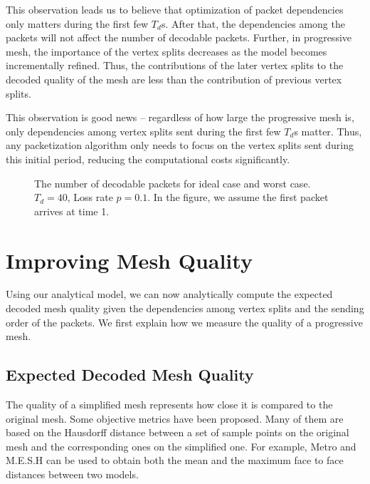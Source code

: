     This observation leads us to believe that optimization of
    packet dependencies only matters during the first few $T_d$s. 
    After that, the dependencies among the packets will not affect
    the number of decodable packets.  Further, in progressive mesh,
    the importance of the vertex splits decreases as the model becomes
    incrementally refined.  Thus, the contributions of the later vertex
    splits to the decoded quality of the mesh are less than the contribution
    of previous vertex splits.

    This observation is good news -- regardless of how large the
    progressive mesh is, only dependencies among vertex splits sent during the
    first few $T_d$s matter.  Thus, any packetization
    algorithm only needs to focus on the vertex splits sent during
    this initial period, reducing the computational costs significantly.

\begin{figure}[htbp]
\centering
{}
\caption{The number of decodable packets for ideal case and worst case. $T_d= 40$, Loss rate $p =0.1$. In the figure, we assume the first packet arrives at time 1.}\label{model:extreme}
\end{figure}


\section{Improving Mesh Quality}
\label{s:model:quality}
    Using our analytical model, we can now analytically compute the
    expected decoded mesh quality given the dependencies among %
    vertex splits and %
    the sending order of the packets.
    We first explain how we measure the
    quality of a progressive mesh.
\subsection{Expected Decoded Mesh Quality}
\label{s:model:analytical_quality}
    The quality of a simplified mesh represents how close it
    is compared to the original mesh. Some objective
    metrics have been proposed. Many of them are based on the
    Hausdorff distance between a set of sample points on the original
    mesh and the corresponding ones on the simplified one.
    For example, Metro \cite{cignoni98metro} and M.E.S.H \cite{mesh:aspert}
    can be used to obtain both the mean and the maximum face to face distances
    between two models.

